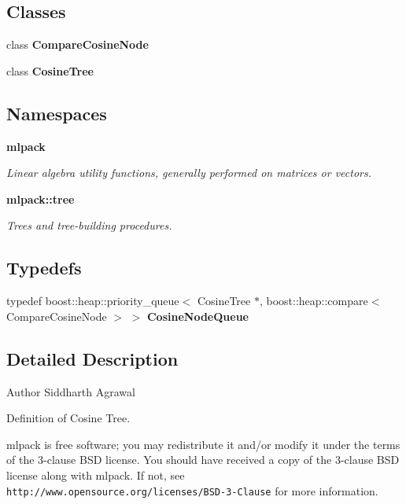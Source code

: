 \subsection*{Classes}
\begin{DoxyCompactItemize}
\item 
class \textbf{ Compare\+Cosine\+Node}
\item 
class \textbf{ Cosine\+Tree}
\end{DoxyCompactItemize}
\subsection*{Namespaces}
\begin{DoxyCompactItemize}
\item 
 \textbf{ mlpack}
\begin{DoxyCompactList}\small\item\em Linear algebra utility functions, generally performed on matrices or vectors. \end{DoxyCompactList}\item 
 \textbf{ mlpack\+::tree}
\begin{DoxyCompactList}\small\item\em Trees and tree-\/building procedures. \end{DoxyCompactList}\end{DoxyCompactItemize}
\subsection*{Typedefs}
\begin{DoxyCompactItemize}
\item 
typedef boost\+::heap\+::priority\+\_\+queue$<$ Cosine\+Tree $\ast$, boost\+::heap\+::compare$<$ Compare\+Cosine\+Node $>$ $>$ \textbf{ Cosine\+Node\+Queue}
\end{DoxyCompactItemize}


\subsection{Detailed Description}
\begin{DoxyAuthor}{Author}
Siddharth Agrawal
\end{DoxyAuthor}
Definition of Cosine Tree.

mlpack is free software; you may redistribute it and/or modify it under the terms of the 3-\/clause B\+SD license. You should have received a copy of the 3-\/clause B\+SD license along with mlpack. If not, see {\tt http\+://www.\+opensource.\+org/licenses/\+B\+S\+D-\/3-\/\+Clause} for more information. 